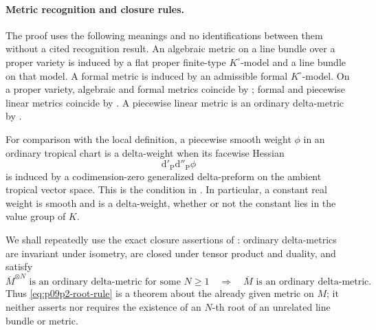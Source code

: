 \paragraph{Metric recognition and closure rules.}
The proof uses the following meanings and no identifications between them
without a cited recognition result.  An algebraic metric on a line bundle
over a proper variety is induced by a flat proper finite-type
\(K^\circ\)-model and a line bundle on that model.  A formal metric is
induced by an admissible formal \(K^\circ\)-model.  On a proper variety,
algebraic and formal metrics coincide by
\cite[Proposition~8.13]{GK17}; formal and piecewise linear metrics coincide
by \cite[Proposition~8.11]{GK17}.  A piecewise linear metric is an ordinary
delta-metric by \cite[\S9.13 and Remark~9.16]{GK17}.

For comparison with the local definition, a piecewise smooth weight
\(\phi\) in an ordinary tropical chart is a delta-weight when its facewise
Hessian
\[
                 \mathrm d'_{\mathrm P}\mathrm d''_{\mathrm P}\phi
\]
is induced by a codimension-zero generalized delta-preform on the ambient
tropical vector space.  This is the condition in
\cite[Definition~9.9 and \S9.13]{GK17}.  In particular, a constant real
weight is smooth and is a delta-weight, whether or not the constant lies in
the value group of \(K\).

We shall repeatedly use the exact closure assertions of
\cite[\S9.14]{GK17}: ordinary delta-metrics are invariant under isometry,
are closed under tensor product and duality, and satisfy
\begin{equation}
\label{eq:p09p2-root-rule}
 \overline M^{\otimes N}\text{ is an ordinary delta-metric for some }N\geq1
 \quad\Longrightarrow\quad
 \overline M\text{ is an ordinary delta-metric}.
\end{equation}
Thus \eqref{eq:p09p2-root-rule} is a theorem about the already given metric
on \(M\); it neither asserts nor requires the existence of an \(N\)-th root
of an unrelated line bundle or metric.

